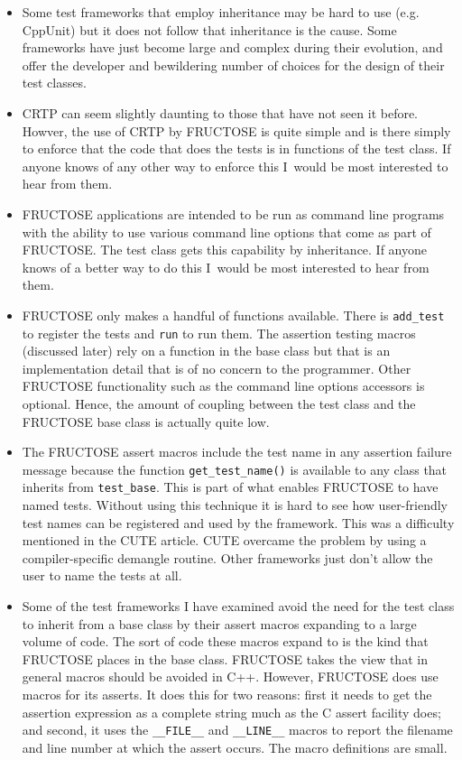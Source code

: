 \documentclass{book}
\begin{document}
\begin{itemize}
\item Some test frameworks that employ inheritance may be hard to use
(e.g. CppUnit) but it does not follow that inheritance is the cause.
Some frameworks have just become large and complex during their evolution,
and offer the developer and bewildering number of choices for the design
of their test classes.

\item CRTP can seem slightly daunting to those that have not seen it before.
Howver, the use of CRTP by FRUCTOSE is quite simple and is there simply to
enforce that the code that does the tests is in functions of the test class.
If anyone knows of any other way to enforce this I~would be most
interested to hear from them.

\item FRUCTOSE applications are intended to be run as command line
programs with the ability to use various command line options that come
as part of FRUCTOSE. The test class gets this capability by inheritance.
If anyone knows of a better way to do this I~would be most
interested to hear from them.

\item FRUCTOSE only makes a handful of functions available.
There is {\tt add\_test} to register the tests and {\tt run} to run
them. The assertion testing macros (discussed later) rely on a function
in the base class but that is an implementation detail that is of no
concern to the programmer.
Other FRUCTOSE functionality such as the command line options accessors 
is optional.
Hence, the amount of coupling between the test class and the FRUCTOSE
base class is actually quite low.

\item The FRUCTOSE assert macros include the test name in any assertion
failure message because the function {\tt get\_test\_name()} is
available to any class that inherits from {\tt test\_base}.
This is part of what enables FRUCTOSE to have named tests.
Without using this technique it is hard to see how user-friendly
test names can be registered and used by the framework.
This was a difficulty mentioned in the CUTE article.
CUTE overcame the problem by using a compiler-specific demangle routine.
Other frameworks just don't allow the user to name the tests at all.

\item Some of  the test frameworks I have examined avoid the need for the
test class to inherit from a base class by their
assert macros expanding to a large volume of code.
The sort of code these macros expand to is the kind that FRUCTOSE places
in the base class. FRUCTOSE takes the view that in general macros should
be avoided in C++. However, FRUCTOSE does use macros for its asserts.
It does this for two reasons:
first it needs to get the assertion expression as a complete string much
as the C assert facility does; and second, it uses the {\tt \_\_FILE\_\_}
and {\tt \_\_LINE\_\_} macros to report the filename and line number
at which the assert occurs. The macro definitions are small.


\end{itemize}
\end{document}
